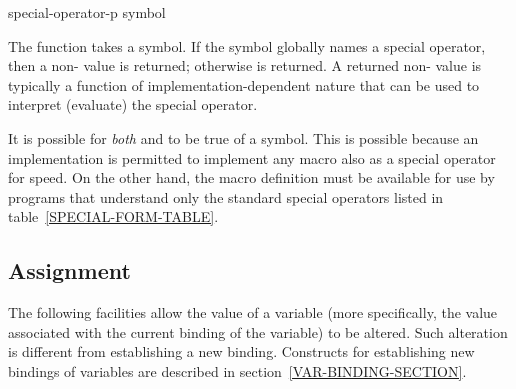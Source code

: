 \begin{defun}[Function]
special-operator-p symbol

The function  takes a symbol.  If the symbol
globally names a special operator,
then a non-{\false} value is returned; otherwise {\false} is returned.
A returned non-{\nil} value is typically a function
of implementation-dependent nature that can be used to
interpret (evaluate) the special operator.

It is possible for \emph{both}  and 
to be true of a symbol.  This is possible because an implementation is
permitted to implement any macro also as a special operator for speed.
On the other hand, the macro definition must be available
for use by programs that understand only the standard special operators
listed in table~\ref{SPECIAL-FORM-TABLE}.
\end{defun}

\subsection{Assignment}

The following facilities allow the value of a variable (more specifically,
the value associated with the current binding of the variable) to be altered.
Such alteration is different from establishing a new binding.
Constructs for establishing new bindings of variables are described
in section~\ref{VAR-BINDING-SECTION}.


